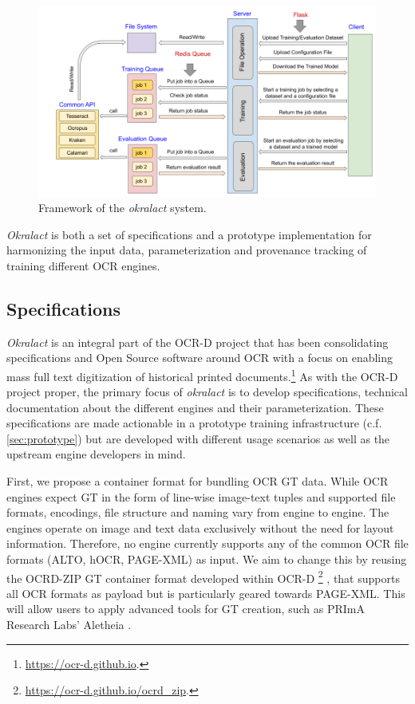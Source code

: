 \documentclass[sigconf]{acmart}
\begin{document}
\begin{figure}[ht!]
    \begin{center}
        \includegraphics[width=1\linewidth]{Figures/Framework.png}
    \end{center}
    \caption{Framework of the \textit{okralact} system.}
    \label{fig:framework}
\end{figure}

\textit{Okralact} is both a set of specifications and a prototype
implementation for harmonizing the input data, parameterization and
provenance tracking of training different OCR engines.

\subsection{Specifications}
\label{sec:specs}

\textit{Okralact} is an integral part of the OCR-D project that has been
consolidating specifications and Open Source software around OCR
with a focus on enabling mass full text digitization of historical
printed documents.\footnote{\url{https://ocr-d.github.io}.} As with the
OCR-D project proper, the primary focus of \textit{okralact} is to develop
specifications, technical documentation about the different engines
and their parameterization. These specifications are made
actionable in a prototype training infrastructure (c.f.
\ref{sec:prototype}) but are developed with different usage
scenarios as well as the upstream engine developers in mind.

First, we propose a container format for bundling OCR GT data.
While OCR engines expect GT in the form of line-wise image-text
tuples and supported file formats, encodings, file structure and
naming vary from engine to engine. The engines operate on image and
text data exclusively without the need for layout information.
Therefore, no engine currently supports any of the common OCR file
formats (ALTO, hOCR, PAGE-XML) as input. We aim to change this by
reusing the OCRD-ZIP GT container format developed
within OCR-D \footnote{\url{https://ocr-d.github.io/ocrd_zip}.}
\cite{boenig2019datech}, that supports all OCR formats as payload but is
particularly geared towards PAGE-XML. This will allow users to apply advanced
tools for GT creation, such as PRImA Research Labs' Aletheia
\cite{clausner2011aletheia}.
\end{document}
